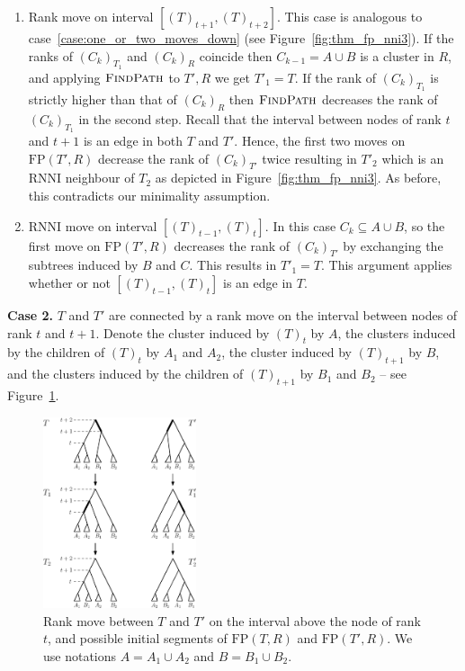 \documentclass[11pt]{amsart}
\newcommand{\rnni}{\mathrm{RNNI}}
\newcommand{\findpath}{\textsc{FindPath}}
\newcommand{\fp}{\mathrm{FP}}
\begin{document}
\begin{enumerate}[label = 1.{\arabic*}]
\item Rank move on interval $[(T)_{t+1},(T)_{t+2}]$.
\label{case:rank_move_interval_above}
This case is analogous to case~\ref{case:one_or_two_moves_down} (see Figure~\ref{fig:thm_fp_nni3}).
If the ranks of $(C_k)_{T_1}$ and $(C_k)_R$ coincide then $C_{k-1} = A \cup B$ is a cluster in $R$, and applying $\findpath$ to $T', R$ we get $T'_1 = T$.
If the rank of $(C_k)_{T_1}$ is strictly higher than that of $(C_k)_R$ then $\findpath$ decreases the rank of $(C_k)_{T_1}$ in the second step.
Recall that the interval between nodes of rank $t$ and $t+1$ is an edge in both $T$ and $T'$.
Hence, the first two moves on $\fp(T', R)$ decrease the rank of $(C_k)_{T'}$ twice resulting in $T'_2$ which is an $\rnni$ neighbour of $T_2$ as depicted in Figure~\ref{fig:thm_fp_nni3}.
As before, this contradicts our minimality assumption.

\item $\rnni$ move on interval $[(T)_{t-1},(T)_t]$.
In this case $C_k \subseteq A \cup B$, so the first move on $\fp(T', R)$ decreases the rank of $(C_k)_{T'}$ by exchanging the subtrees induced by $B$ and $C$.
This results in $T'_1 = T$.
This argument applies whether or not $[(T)_{t-1},(T)_t]$ is an edge in $T$.
\end{enumerate}

\textbf{Case 2.}
$T$ and $T'$ are connected by a rank move on the interval between nodes of rank $t$ and $t+1$.
Denote the cluster induced by $(T)_t$ by $A$, the clusters induced by the children of $(T)_t$ by $A_1$ and $A_2$, the cluster induced by $(T)_{t+1}$ by $B$, and the clusters induced by the children of $(T)_{t+1}$ by $B_1$ and $B_2$ -- see Figure~\ref{fig:thm_fp_rank1}.

\begin{figure}[ht]
\centering
\includegraphics[width=0.4\textwidth]{thm_fp_rank1}
\caption{Rank move between $T$ and $T'$ on the interval above the node of rank $t$, and possible initial segments of $\fp(T, R)$ and $\fp(T', R)$.
We use notations ${A = A_1 \cup A_2}$ and $B = B_1 \cup B_2$.}
\label{fig:thm_fp_rank1}
\end{figure}
\end{document}
